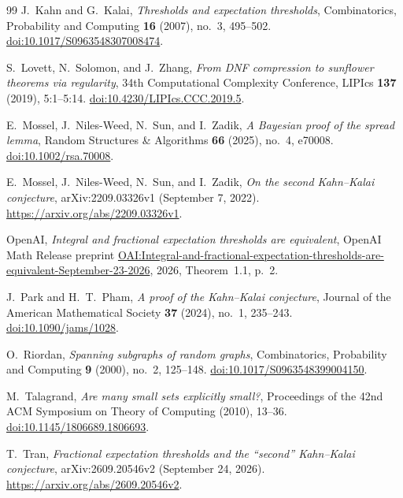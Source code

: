 \documentclass[11pt]{article}
\numberwithin{equation}{section}
\begin{document}
\begin{thebibliography}{99}
J.~Kahn and G.~Kalai,
\emph{Thresholds and expectation thresholds},
Combinatorics, Probability and Computing
\textbf{16} (2007), no.~3, 495--502.
\href{https://doi.org/10.1017/S0963548307008474}{doi:10.1017/S0963548307008474}.

S.~Lovett, N.~Solomon, and J.~Zhang,
\emph{From DNF compression to sunflower theorems via regularity},
34th Computational Complexity Conference, LIPIcs \textbf{137} (2019),
5:1--5:14.
\href{https://doi.org/10.4230/LIPIcs.CCC.2019.5}{doi:10.4230/LIPIcs.CCC.2019.5}.

E.~Mossel, J.~Niles-Weed, N.~Sun, and I.~Zadik,
\emph{A Bayesian proof of the spread lemma},
Random Structures \& Algorithms \textbf{66} (2025), no.~4, e70008.
\href{https://doi.org/10.1002/rsa.70008}{doi:10.1002/rsa.70008}.

E.~Mossel, J.~Niles-Weed, N.~Sun, and I.~Zadik,
\emph{On the second Kahn--Kalai conjecture},
arXiv:2209.03326v1 (September 7, 2022).
\url{https://arxiv.org/abs/2209.03326v1}.

OpenAI,
\emph{Integral and fractional expectation thresholds are equivalent},
OpenAI Math Release preprint
\href{https://github.com/openai/math/blob/main/preprints/Integral-and-fractional-expectation-thresholds-are-equivalent-September-23-2026/paper.pdf}{OAI:Integral-and-fractional-expectation-thresholds-are-equivalent-September-23-2026},
2026, Theorem~1.1, p.~2.

J.~Park and H.~T.~Pham,
\emph{A proof of the Kahn--Kalai conjecture},
Journal of the American Mathematical Society
\textbf{37} (2024), no.~1, 235--243.
\href{https://doi.org/10.1090/jams/1028}{doi:10.1090/jams/1028}.

O.~Riordan,
\emph{Spanning subgraphs of random graphs},
Combinatorics, Probability and Computing
\textbf{9} (2000), no.~2, 125--148.
\href{https://doi.org/10.1017/S0963548399004150}{doi:10.1017/S0963548399004150}.

M.~Talagrand,
\emph{Are many small sets explicitly small?},
Proceedings of the 42nd ACM Symposium on Theory of Computing (2010),
13--36.
\href{https://doi.org/10.1145/1806689.1806693}{doi:10.1145/1806689.1806693}.

T.~Tran,
\emph{Fractional expectation thresholds and the ``second'' Kahn--Kalai
conjecture},
arXiv:2609.20546v2 (September 24, 2026).
\url{https://arxiv.org/abs/2609.20546v2}.

\end{thebibliography}
\end{document}
